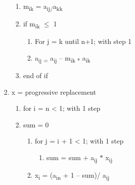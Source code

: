 \documentclass[12pt]{article}
\renewcommand{\_}{\kern-1.5pt\textunderscore\kern-1.5pt}
\begin{document}
\begin{enumerate}
\begin{enumerate}
\begin{enumerate}
	\item m\textsubscript{ik }= a\textsubscript{ij/}a\textsubscript{kk}\par

	\item if m\textsubscript{ik} $ \leq $  1\par

\begin{enumerate}
	\item For j = k until n+1; with step 1 \par

	\item a\textsubscript{ij = }a\textsubscript{ij }– m\textsubscript{ik $\ast$ } a\textsubscript{ik}\par


\end{enumerate}
	\item end of if\par


\end{enumerate}
	\item x = progressive replacement \par

\begin{enumerate}
	\item for i = n < 1; with 1 step\par

	\item sum = 0\par

\begin{enumerate}
	\item for j = i + 1 < 1; with 1 step\par

\begin{enumerate}
	\item sum = sum + a\textsubscript{ij }$\ast$  x\textsubscript{ij}\par


\end{enumerate}
	\item x\textsubscript{i }= (a\textsubscript{in }+ 1 – sum)/ a\textsubscript{ij}
\end{enumerate}
\end{enumerate}
\end{enumerate}
\end{enumerate}\par


\vspace{\baselineskip}

\vspace{\baselineskip}

\printbibliography
\end{document}
